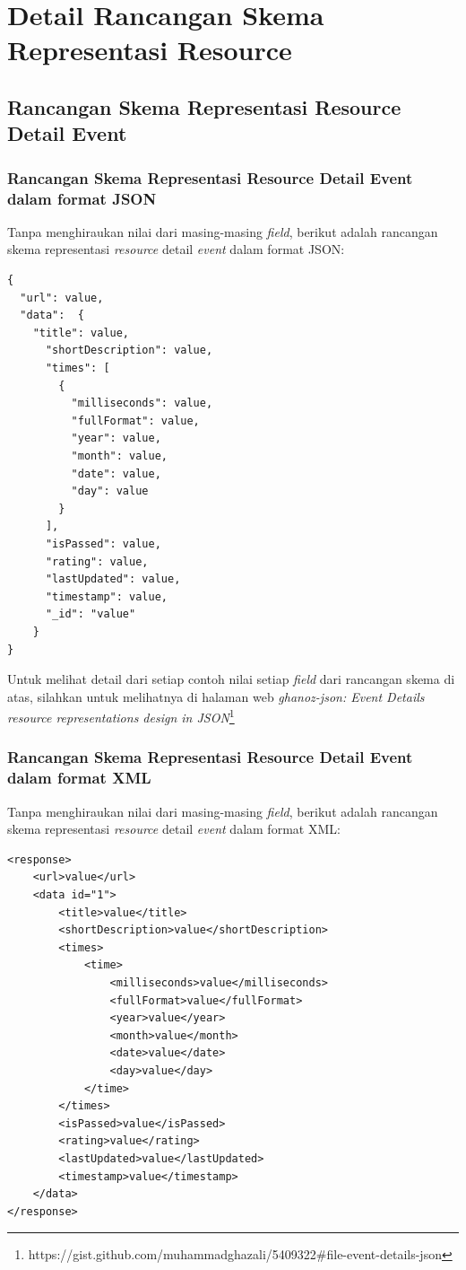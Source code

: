\documentclass[a4paper, 12pt, oneside]{report}
\begin{document}
\chapter{Detail Rancangan Skema Representasi Resource} \label{lampiran:detail-rancangan-skema-representasi-res}
\section{Rancangan Skema Representasi Resource Detail Event}
\subsection{Rancangan Skema Representasi Resource Detail Event dalam format JSON}
\onehalfspacing Tanpa menghiraukan nilai dari masing-masing \textit{field}, berikut adalah rancangan skema representasi \textit{resource} detail \textit{event} dalam format JSON:

\begin{lstlisting}[frame=single]
{
  "url": value,
  "data":  {
    "title": value,
      "shortDescription": value,
      "times": [
        {
          "milliseconds": value,
          "fullFormat": value,
          "year": value,
          "month": value,
          "date": value,
          "day": value
        }
      ],
      "isPassed": value,
      "rating": value,
      "lastUpdated": value,
      "timestamp": value,
      "_id": "value"
    }
}
\end{lstlisting}

\onehalfspacing Untuk melihat detail dari setiap contoh nilai setiap \textit{field} dari rancangan skema di atas, silahkan untuk melihatnya di halaman web \textit{ghanoz-json: Event Details resource representations design in JSON}\footnote{https://gist.github.com/muhammadghazali/5409322\#file-event-details-json}

\subsection{Rancangan Skema Representasi Resource Detail Event dalam format XML}
\onehalfspacing Tanpa menghiraukan nilai dari masing-masing \textit{field}, berikut adalah rancangan skema representasi \textit{resource} detail \textit{event} dalam format XML:

\begin{lstlisting}[frame=single]
<response>
    <url>value</url>
    <data id="1">
        <title>value</title>
        <shortDescription>value</shortDescription>
        <times>
            <time>
                <milliseconds>value</milliseconds>
                <fullFormat>value</fullFormat>
                <year>value</year>
                <month>value</month>
                <date>value</date>
                <day>value</day>
            </time>
        </times>
        <isPassed>value</isPassed>
        <rating>value</rating>
        <lastUpdated>value</lastUpdated>
        <timestamp>value</timestamp>
    </data>
</response>
\end{lstlisting}
\end{document}
